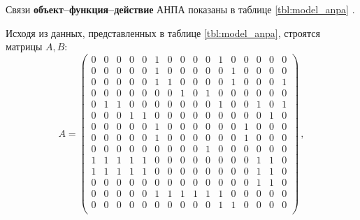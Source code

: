 Связи \textbf{объект--функция--действие} АНПА показаны в таблице \ref{tbl:model_anpa} \cite{journal:vestnik_igeu:elizarova}.
%

%
Исходя из данных, представленных в таблице \ref{tbl:model_anpa},
строятся матрицы $A, B$:
%
\begin{equation}
    A = \begin{pmatrix}
    0 &   0 &   0 &   0 &   0 &   1 &   0 &   0 &   0 &   0 &   1 &   0 &   0 &   0 &   0 &   0 \\
    0 &   0 &   0 &   0 &   0 &   1 &   0 &   0 &   0 &   0 &   0 &   1 &   0 &   0 &   0 &   0 \\
    0 &   0 &   0 &   0 &   0 &   1 &   1 &   0 &   0 &   0 &   0 &   1 &   0 &   0 &   0 &   1 \\
    0 &   0 &   0 &   0 &   0 &   0 &   0 &   1 &   0 &   1 &   0 &   0 &   0 &   0 &   0 &   0 \\
    0 &   1 &   1 &   0 &   0 &   0 &   0 &   0 &   0 &   0 &   1 &   0 &   0 &   1 &   0 &   1 \\
    0 &   0 &   0 &   1 &   1 &   0 &   0 &   0 &   0 &   0 &   0 &   0 &   0 &   0 &   1 &   0 \\
    0 &   0 &   0 &   0 &   0 &   1 &   0 &   0 &   0 &   0 &   0 &   0 &   1 &   0 &   0 &   0 \\
    0 &   0 &   0 &   0 &   0 &   1 &   0 &   0 &   0 &   0 &   0 &   0 &   1 &   0 &   0 &   0 \\
    0 &   0 &   0 &   0 &   0 &   0 &   0 &   0 &   0 &   1 &   0 &   0 &   0 &   0 &   0 &   0 \\
    1 &   1 &   1 &   1 &   1 &   0 &   0 &   0 &   0 &   0 &   0 &   0 &   0 &   1 &   1 &   0 \\
    1 &   1 &   1 &   1 &   1 &   0 &   0 &   0 &   0 &   0 &   0 &   0 &   0 &   1 &   1 &   0 \\
    0 &   0 &   0 &   0 &   0 &   0 &   0 &   0 &   0 &   0 &   0 &   0 &   0 &   1 &   1 &   0 \\
    0 &   0 &   0 &   0 &   0 &   1 &   1 &   1 &   1 &   1 &   1 &   0 &   0 &   0 &   0 &   0 \\
    0 &   0 &   0 &   0 &   0 &   0 &   0 &   0 &   0 &   0 &   1 &   1 &   0 &   0 &   0 &   0 \\
    \end{pmatrix}\,,
    

\end{equation}
